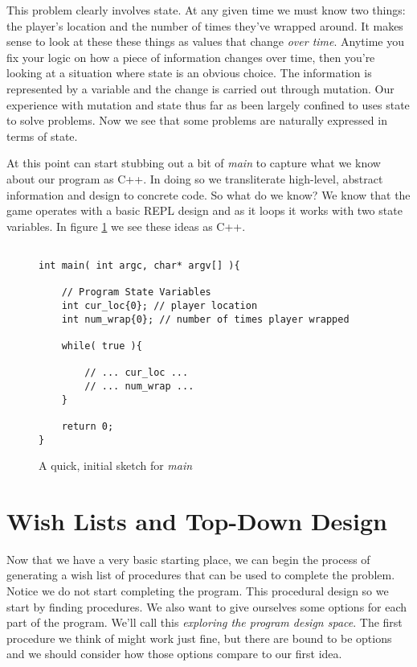 \documentclass[nobib]{tufte-handout}
\begin{document}
This problem clearly involves state. At any given time we must know two things: the player's location and the number of times they've wrapped around. It makes sense to look at these these things as values that change \textit{over time}. Anytime you fix your logic on how a piece of information changes over time, then you're looking at a situation where state is an obvious choice. The information is represented by a variable and the change is carried out through mutation. Our experience with mutation and state thus far as been largely confined to uses state to solve problems. Now we see that some problems are naturally expressed in terms of state. 

At this point can start stubbing out a bit of \textit{main} to capture what we know about our program as C++. In doing so we  transliterate high-level, abstract information and design to concrete code.  So what do we know? We know that the game operates with a basic REPL design and as it loops it works with two state variables. In figure \ref{fig:mainstub1} we see these ideas as C++.
 
\begin{figure}[!htbp]
\begin{lstlisting}

int main( int argc, char* argv[] ){

	// Program State Variables
	int cur_loc{0}; // player location
	int num_wrap{0}; // number of times player wrapped
	
	while( true ){
	
		// ... cur_loc ...
	 	// ... num_wrap ...
	}

	return 0;
}

\end{lstlisting}
\caption{A quick, initial sketch for \textit{main}}
\label{fig:mainstub1}
\end{figure}

\section{Wish Lists and Top-Down Design}

Now that we have a very basic starting place, we can begin the process of generating a wish list of procedures that can be used to complete the problem. Notice we do not start completing the program. This procedural design so we start by finding procedures. We also want to give ourselves some options for each part of the program. We'll call this \textit{exploring the program design space}. The first procedure we think of might work just fine, but there are bound to be options and we should consider how those options compare to our first idea.
\end{document}
